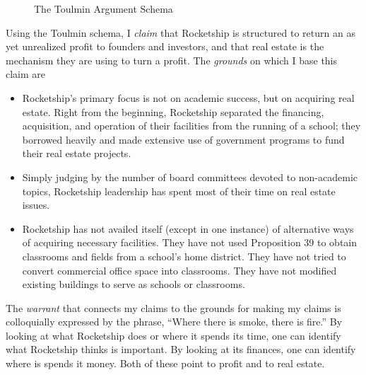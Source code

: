 \begin{figure}[ht]
  \caption{The Toulmin Argument Schema}%
  \label{fig:toulmin-arg}%
\end{figure}

Using the Toulmin schema, I \textit{claim} that Rocketship is structured to return an as yet unrealized profit to founders and investors, and that real estate is the mechanism they are using to turn a profit. The \textit{grounds} on which I base this claim are
\begin{itemize}
  \item Rocketship's primary focus is not on academic success, but on acquiring real estate. Right from the beginning, Rocketship separated the financing, acquisition, and operation of their facilities from the running of a school; they borrowed heavily and made extensive use of government programs to fund their real estate projects.
  \item Simply judging by the number of board committees devoted to non-academic topics, Rocketship leadership has spent most of their time on real estate issues.
  \item Rocketship has not availed itself (except in one instance) of alternative ways of acquiring necessary facilities. They have not used Proposition 39 to obtain classrooms and fields from a school's home district. They have not tried to convert commercial office space into classrooms. They have not modified existing buildings to serve as schools or classrooms.
\end{itemize}
The \textit{warrant} that connects my claims to the grounds for making my claims is colloquially expressed by the phrase, ``Where there is smoke, there is fire.'' By looking at what Rocketship does or where it spends its time, one can identify what Rocketship thinks is important. By looking at its finances, one can identify where is spends it money. Both of these point to profit and to real estate.

